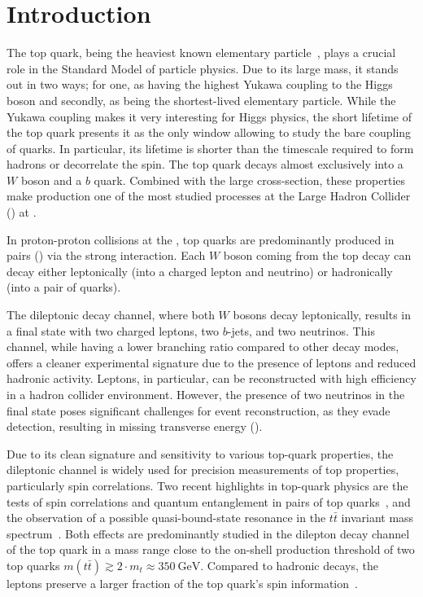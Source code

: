 \chapter{Introduction}
\label{chap:introduction}
The top quark, being the heaviest known elementary particle~\cite{top_discovery_cdf,top_discovery_d0}, plays a crucial role in the Standard Model of particle physics. Due to its large mass, it stands out in two ways; for one, as having the highest Yukawa coupling to the Higgs boson and secondly, as being the shortest-lived elementary particle. While the Yukawa coupling makes it very interesting for Higgs physics, the short lifetime of the top quark presents it as the only window allowing to study the bare coupling of quarks. In particular, its lifetime is shorter than the timescale required to form hadrons or decorrelate the spin. The top quark decays almost exclusively into a $W$ boson and a $b$ quark. Combined with the large cross-section, these properties make \ttbar production one of the most studied processes at the Large Hadron Collider (\lhc) at \cern.

In proton-proton collisions at the \lhc, top quarks are predominantly produced in pairs (\ttbar) via the strong interaction. Each $W$ boson coming from the top decay can decay either leptonically (into a charged lepton and neutrino) or hadronically (into a pair of quarks).

The dileptonic decay channel, where both $W$ bosons decay leptonically, results in a final state with two charged leptons, two $b$-jets, and two neutrinos. This channel, while having a lower branching ratio compared to other decay modes, offers a cleaner experimental signature due to the presence of leptons and reduced hadronic activity. Leptons, in particular, can be reconstructed with high efficiency in a hadron collider environment. However, the presence of two neutrinos in the final state poses significant challenges for event reconstruction, as they evade detection, resulting in missing transverse energy (\met).

Due to its clean signature and sensitivity to various top-quark properties, the dileptonic \ttbar channel is widely used for precision measurements of top properties, particularly spin correlations. Two recent highlights in top-quark physics are the tests of spin correlations and quantum entanglement in pairs of top quarks~\cite{atlas_entanglement}, and the observation of a possible quasi-bound-state resonance in the $t\bar{t}$ invariant mass spectrum~\cite{atlas_toponium,CMS2025Pseudoscalar}. Both effects are predominantly studied in the dilepton decay channel of the top quark in a mass range close to the on-shell production threshold of two top quarks $m(t\bar{t})\gtrsim 2\cdot m_t\approx \qty{350}{\giga\electronvolt}$. Compared to hadronic decays, the leptons preserve a larger fraction of the top quark's spin information~\cite{spin_analyzing_power,spin_analyzing_power_jets}.

